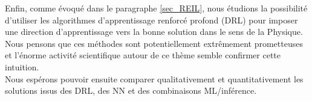 \documentclass[a4paper,12pt]{article}
\numberwithin{equation}{section} %
\begin{document}
\noindent Enfin, comme évoqué dans le paragraphe \eqref{sec_REIL}, nous étudions la possibilité d'utiliser les algorithmes d'apprentissage renforcé profond (DRL) pour imposer une direction d'apprentissage vers la bonne solution dans le sens de la Physique. Nous pensons que ces méthodes sont potentiellement extrêmement prometteuses et l'énorme activité scientifique autour de ce thème semble confirmer cette intuition.\\
Nous espérons pouvoir ensuite comparer qualitativement et quantitativement les solutions issus des DRL, des NN et des combinaisons ML/inférence.\\





\pagebreak



\end{document}

